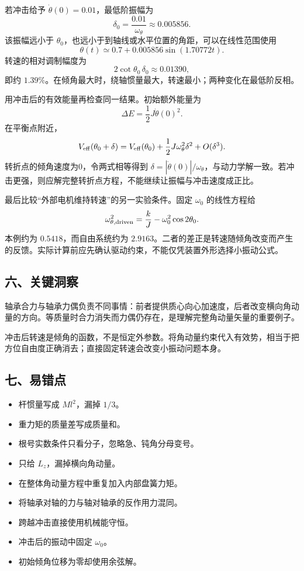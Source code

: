 \documentclass[12pt,a4paper,fontset=fandol]{ctexart}
\providecommand{\tightlist}{\setlength{\itemsep}{0pt}\setlength{\parskip}{0pt}}
\begin{document}
若冲击给予 \(\dot\theta(0)=0.01\)，最低阶振幅为 \[
\delta_0=\frac{0.01}{\omega_\theta}\approx0.005856.
\] 该振幅远小于
\(\theta_0\)，也远小于到轴线或水平位置的角距，可以在线性范围使用 \[
\theta(t)\simeq0.7+0.005856\sin(1.70772t).
\] 转速的相对调制幅度为 \[
2\cot\theta_0\,\delta_0\approx0.01390,
\] 即约
\(1.39\%\)。在倾角最大时，绕轴惯量最大，转速最小；两种变化在最低阶反相。

用冲击后的有效能量再检查同一结果。初始额外能量为 \[
\Delta E=\frac12J\dot\theta(0)^2.
\] 在平衡点附近， \[
V_{\rm eff}(\theta_0+\delta)
=V_{\rm eff}(\theta_0)+\frac12J\omega_\theta^2\delta^2
+O(\delta^3).
\] 转折点的倾角速度为0，令两式相等得到
\(\delta=|\dot\theta(0)|/\omega_\theta\)，与动力学解一致。若冲击更强，则应解完整转折点方程，不能继续让振幅与冲击速度成正比。

最后比较``外部电机维持转速''的另一实验条件。固定 \(\omega_0\)
的线性方程给 \[
\omega_{\theta,\rm driven}^2
=\frac{k}{J}-\omega_0^2\cos2\theta_0.
\] 本例约为 \(0.5418\)，而自由系统约为
\(2.9163\)。二者的差正是转速随倾角改变而产生的反馈。实际计算前应先确认驱动约束，不能仅凭装置外形选择小振动公式。

\subsection{六、关键洞察}\label{ux516dux5173ux952eux6d1eux5bdf-5}

轴承合力与轴承力偶负责不同事情：前者提供质心向心加速度，后者改变横向角动量的方向。等质量时合力消失而力偶仍存在，是理解完整角动量矢量的重要例子。

冲击后转速是倾角的函数，不是恒定外参数。将角动量约束代入有效势，相当于把方位自由度正确消去；直接固定转速会改变小振动问题本身。

\subsection{七、易错点}\label{ux4e03ux6613ux9519ux70b9-5}

\begin{itemize}
\tightlist
\item
  杆惯量写成 \(Ml^2\)，漏掉 \(1/3\)。
\item
  重力矩的质量差写成质量和。
\item
  根号实数条件只看分子，忽略急、钝角分母变号。
\item
  只给 \(L_z\)，漏掉横向角动量。
\item
  在整体角动量方程中重复加入内部盘簧力矩。
\item
  将轴承对轴的力与轴对轴承的反作用力混同。
\item
  跨越冲击直接使用机械能守恒。
\item
  冲击后的振动中固定 \(\omega_0\)。
\item
  初始倾角位移为零却使用余弦解。
\end{itemize}
\end{document}

